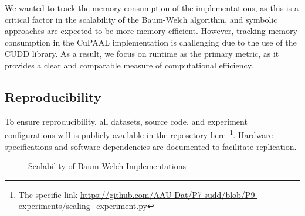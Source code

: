 We wanted to track the memory consumption of the implementations, as this is a critical factor in the scalability of the Baum-Welch algorithm, and symbolic approaches are expected to be more memory-efficient.
However, tracking memory consumption in the CuPAAL implementation is challenging due to the use of the CUDD library.
As a result, we focus on runtime as the primary metric, as it provides a clear and comparable measure of computational efficiency.

\subsection{Reproducibility}
To ensure reproducibility, all datasets, source code, and experiment configurations will is publicly available in the reposetory here~\cite{p7}\footnote{The specific link \url{https://github.com/AAU-Dat/P7-sudd/blob/P9-experiments/scaling_experiment.py}}. 
Hardware specifications and software dependencies are documented to facilitate replication.

\begin{figure}
    \centering
    
    \caption{Scalability of Baum-Welch Implementations}
    \label{fig:scalability}
\end{figure}
